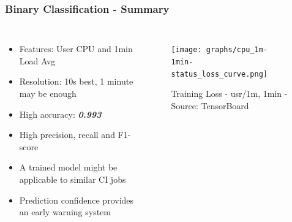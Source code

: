 \documentclass[aspectratio=169,11pt,hyperref={colorlinks=true}]{beamer}
\begin{document}
\begin{frame}
    \frametitle{Binary Classification - Summary}
    \begin{columns}
        \begin{itemize}
            \item{Features: User CPU and 1min Load Avg}
            \item{Resolution: 10s best, 1 minute may be enough}
            \item{High accuracy: \emph{\textbf{0.993}}}
            \item{High precision, recall and F1-score}
            \item{A trained model might be applicable to similar CI jobs}
            \item{Prediction confidence provides an early warning system}
        \end{itemize}
        \begin{figure}
          \begin{center}
            \texttt{[image: graphs/cpu\_1m-1min-status\_loss\_curve.png]}
              \caption{Training Loss - usr/1m, 1min - Source: TensorBoard}
          \end{center}
        \end{figure}
      \end{columns}
\end{frame}
\end{document}
